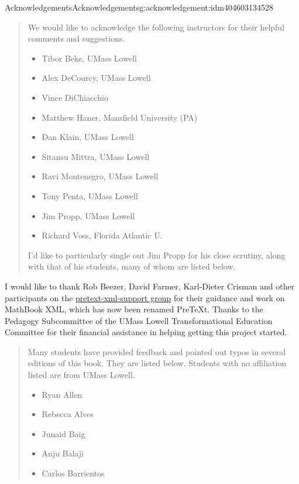 \documentclass[twoside,10pt,]{book}
\numberwithin{equation}{section}
\begin{document}
\begin{acknowledgement}{Acknowledgements}{}{Acknowledgements}{}{}{g:acknowledgement:idm404603134528}
\begin{quote}%
We would like to acknowledge the following instructors for their helpful comments and suggestions.%
\begin{multicols}{2}
\begin{itemize}[label=\textbullet]
\item{}Tibor Beke, UMass Lowell%
\item{}Alex DeCourcy, UMass Lowell%
\item{}Vince DiChiacchio%
\item{}Matthew Haner, Mansfield University (PA)%
\item{}Dan Klain, UMass Lowell%
\item{}Sitansu Mittra, UMass Lowell%
\item{}Ravi Montenegro, UMass Lowell%
\item{}Tony Penta, UMass Lowell%
\item{}Jim Propp, UMass Lowell%
\item{}Richard Voss, Florida Atlantic U.%
\end{itemize}
\end{multicols}
I'd like to particularly single out Jim Propp for his close scrutiny, along with that of his students, many of whom are listed below.%
\end{quote}
I would like to thank Rob Beezer, David Farmer, Karl-Dieter Crisman and other participants on the \href{https://groups.google.com/forum/m/?fromgroups\#!forum/pretext-support}{pretext-xml-support group} for their guidance and work on MathBook XML, which has now been renamed PreTeXt.  Thanks to the Pedagogy Subcommittee of the UMass Lowell Transformational Education Committee for their financial assistance in helping getting this project started.%
\begin{quote}%
Many students have provided feedback and pointed out typos in several editions of this book. They are listed below. Students with no affiliation listed are from UMass Lowell.%
\begin{multicols}{2}
\begin{itemize}[label=\textbullet]
\item{}Ryan Allen%
\item{}Rebecca Alves%
\item{}Junaid Baig%
\item{}Anju Balaji%
\item{}Carlos Barrientos%

\end{itemize}
\end{multicols}
\end{quote}
\end{acknowledgement}
\end{document}
